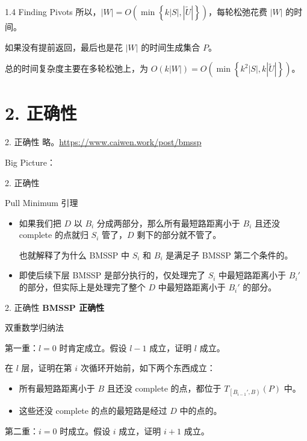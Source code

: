 \documentclass{beamer}
\begin{document}
\begin{frame}{1.4 Finding Pivots}
  所以，$|W|=O(\min\left\{ k|S|, |\widetilde{U}| \right\})$，每轮松弛花费 $|W|$ 的时间。

  如果没有提前返回，最后也是花 $|W|$ 的时间生成集合 $P$。

  总的时间复杂度主要在多轮松弛上，为 $O(k|W|)=O(\min\left\{ k^2|S|, k|\widetilde{U}| \right\})$。
\end{frame}

\section{2. 正确性}

\begin{frame}{2. 正确性}
  略。\url{https://www.caiwen.work/post/bmssp}

  \pause

  Big Picture：
\end{frame}

\begin{frame}{2. 正确性}
  \begin{block}{Pull Minimum 引理}
    \begin{itemize}
      \item 如果我们把 $D$ 以 $B_i$ 分成两部分，那么所有最短路距离小于 $B_i$ 且还没 complete 的点就归 $S_i$ 管了，$D$ 剩下的部分就不管了。
  
        \pause
        也就解释了为什么 BMSSP 中 $S_i$ 和 $B_i$ 是满足子 BMSSP 第二个条件的。

      \pause
      \item 即使后续下层 BMSSP 是部分执行的，仅处理完了 $S_i$ 中最短路距离小于 $B_i'$ 的部分，但实际上是处理完了整个 $D$ 中最短路距离小于 $B_i'$ 的部分。
    \end{itemize}
  \end{block}
\end{frame}
\begin{frame}{2. 正确性}
  \textbf{BMSSP 正确性}

  双重数学归纳法

  \pause

  第一重：$l=0$ 时肯定成立。假设 $l-1$ 成立，证明 $l$ 成立。

  \pause

  在 $l$ 层，证明在第 $i$ 次循环开始前，如下两个东西成立：

  \begin{itemize}
    \item 所有最短路距离小于 $B$ 且还没 complete 的点，都位于 $T_{\left [ B_{i-1}',B \right)}(P)$ 中。
    \pause
    \item 这些还没 complete 的点的最短路是经过 $D$ 中的点的。
  \end{itemize}

  \pause\vspace{0.35em}
  第二重：$i=0$ 时成立。假设 $i$ 成立，证明 $i+1$ 成立。
\end{frame}
\end{document}
